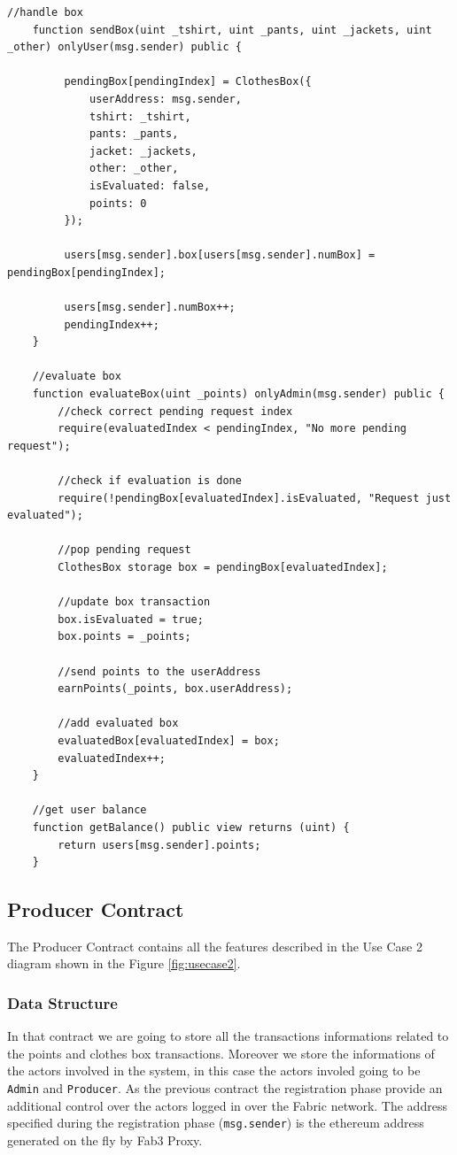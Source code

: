 \begin{lstlisting}[language=Solidity]
    //handle box
    function sendBox(uint _tshirt, uint _pants, uint _jackets, uint _other) onlyUser(msg.sender) public {

         pendingBox[pendingIndex] = ClothesBox({
             userAddress: msg.sender,
             tshirt: _tshirt,
             pants: _pants,
             jacket: _jackets,
             other: _other,
             isEvaluated: false,
             points: 0
         });

         users[msg.sender].box[users[msg.sender].numBox] = pendingBox[pendingIndex];

         users[msg.sender].numBox++;
         pendingIndex++;
    }

    //evaluate box
    function evaluateBox(uint _points) onlyAdmin(msg.sender) public {
        //check correct pending request index
        require(evaluatedIndex < pendingIndex, "No more pending request");

        //check if evaluation is done
        require(!pendingBox[evaluatedIndex].isEvaluated, "Request just evaluated");

        //pop pending request
        ClothesBox storage box = pendingBox[evaluatedIndex];

        //update box transaction
        box.isEvaluated = true;
        box.points = _points;

        //send points to the userAddress
        earnPoints(_points, box.userAddress);

        //add evaluated box
        evaluatedBox[evaluatedIndex] = box;
        evaluatedIndex++;
    }

    //get user balance
    function getBalance() public view returns (uint) {
        return users[msg.sender].points;
    }
\end{lstlisting}

\subsection{Producer Contract}

The Producer Contract contains all the features described in the Use Case 2 diagram shown in 
the Figure \ref{fig:usecase2}.

\subsubsection{Data Structure}

In that contract we are going to store all the transactions informations related to the points and 
clothes box transactions. Moreover we store the informations of the actors involved in the system, in
this case the actors involed going to be \texttt{Admin} and \texttt{Producer}.
As the previous contract the registration phase provide an additional control over the actors logged 
in over the Fabric network. The address specified during the registration phase (\texttt{msg.sender}) is 
the ethereum address generated on the fly by Fab3 Proxy. 
\bigskip

